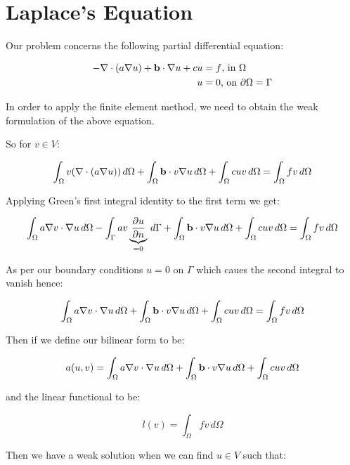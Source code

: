 \chapter{Laplace's Equation}


Our problem concerns the following partial differential equation:

\begin{align}\label{eq:general_laplace}
    -\nabla\cdot(a\nabla{u}) + \mathbf{b}\cdot\nabla{u} + cu &= f \text{, in } \Omega \\
    u &= 0 \text{, on } \partial\Omega = \Gamma
\end{align}

In order to apply the finite element method, we need to obtain the weak
formulation of the above equation.

So for $v \in V$:

\[
    \int_{\Omega}{v(\nabla\cdot(a\nabla{u}))}\,d\Omega +
    \int_{\Omega}\mathbf{b}\cdot v\nabla{u}\,d\Omega +
    \int_{\Omega}cuv\,d\Omega = \int_{\Omega}fv\,d\Omega
\]

Applying Green's first integral identity to the first term we get:

\[
    \int_{\Omega}a\nabla{v}\cdot\nabla{u}\,d\Omega -
    \int_{\Gamma}av
      \underbrace{\frac{\partial{u}}{\partial{n}}}_{=0}
      \,d\Gamma +
    \int_{\Omega}\mathbf{b}\cdot v\nabla{u}\,d\Omega + \int_{\Omega}cuv\,d\Omega =
    \int_{\Omega}fv\,d\Omega
\]

As per our boundary conditions $u=0$ on $\Gamma$ which caues the second
integral to vanish hence:

\[
    \int_{\Omega}a\nabla{v}\cdot\nabla{u}\,d\Omega +
    \int_{\Omega}\mathbf{b}\cdot v\nabla{u}\,d\Omega + \int_{\Omega}cuv\,d\Omega =
    \int_{\Omega}fv\,d\Omega
\]

Then if we define our bilinear form to be:

\[
    a(u,v) =
    \int_{\Omega}a\nabla{v}\cdot\nabla{u}\,d\Omega +
    \int_{\Omega}\mathbf{b}\cdot v\nabla{u}\,d\Omega + \int_{\Omega}cuv\,d\Omega
\]

and the linear functional to be:

\[
    l(v) = \int_{\Omega}fv\,d\Omega
\]

Then we have a weak solution when we can find $u \in V$ such that:

